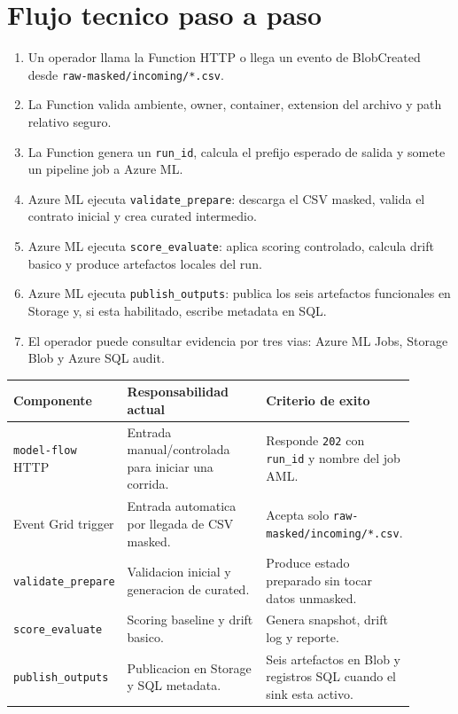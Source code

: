 \documentclass[11pt,letterpaper]{article}
\newcommand{\code}[1]{\texttt{\small #1}}
\begin{document}
\section*{Flujo tecnico paso a paso}

\begin{enumerate}[leftmargin=*]
  \item Un operador llama la Function HTTP o llega un evento de BlobCreated desde \code{raw-masked/incoming/*.csv}.
  \item La Function valida ambiente, owner, container, extension del archivo y path relativo seguro.
  \item La Function genera un \code{run\_id}, calcula el prefijo esperado de salida y somete un pipeline job a Azure ML.
  \item Azure ML ejecuta \code{validate\_prepare}: descarga el CSV masked, valida el contrato inicial y crea curated intermedio.
  \item Azure ML ejecuta \code{score\_evaluate}: aplica scoring controlado, calcula drift basico y produce artefactos locales del run.
  \item Azure ML ejecuta \code{publish\_outputs}: publica los seis artefactos funcionales en Storage y, si esta habilitado, escribe metadata en SQL.
  \item El operador puede consultar evidencia por tres vias: Azure ML Jobs, Storage Blob y Azure SQL audit.
\end{enumerate}

\begin{longtable}{p{0.24\linewidth}p{0.35\linewidth}p{0.31\linewidth}}
\toprule
\textbf{Componente} & \textbf{Responsabilidad actual} & \textbf{Criterio de exito}\\
\midrule
\endhead
\code{model-flow} HTTP & Entrada manual/controlada para iniciar una corrida. & Responde \code{202} con \code{run\_id} y nombre del job AML.\\
Event Grid trigger & Entrada automatica por llegada de CSV masked. & Acepta solo \code{raw-masked/incoming/*.csv}.\\
\code{validate\_prepare} & Validacion inicial y generacion de curated. & Produce estado preparado sin tocar datos unmasked.\\
\code{score\_evaluate} & Scoring baseline y drift basico. & Genera snapshot, drift log y reporte.\\
\code{publish\_outputs} & Publicacion en Storage y SQL metadata. & Seis artefactos en Blob y registros SQL cuando el sink esta activo.\\
\bottomrule
\end{longtable}
\end{document}
